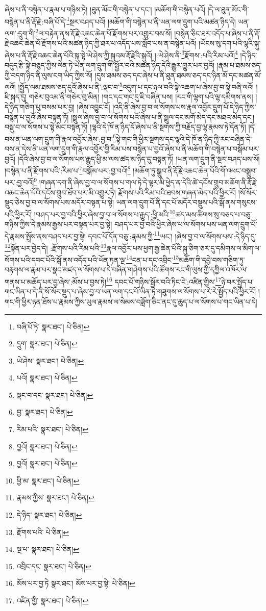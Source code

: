 ཞེས་པ་ནི་བསྙེན་པ་རྣམ་པ་གཉིས་ཏེ། །ཐུན་མོང་གི་བསྙེན་པ་དང་། །མཆོག་གི་བསྙེན་པའོ། །དེ་ལ་ཐུན་མོང་གི་བསྙེན་པ་ནི་རྡོ་རྗེ་:བཞི་པོ་དེ་\footnote{བཞི་པོ་ཏེ་  སྣར་ཐང་།  པེ་ཅིན། }སྔར་བཤད་པའོ། །མཆོག་གི་བསྙེན་པ་ནི་ཡན་ལག་དྲུག་པའི་མཚན་ཉིད་དེ། ཡན་ལག་:དྲུག་གི་\footnote{དྲུག་  སྣར་ཐང་།  པེ་ཅིན། }ལ་བརྟེན་ནས་རྡོ་རྗེ་འཆང་ཆེན་པོ་རྫོགས་པར་འགྱུར་བས་སོ། །བསྙེན་ཅིང་ཐར་འདོད་པ་ཞེས་པ་ནི་རྡོ་རྗེ་འཆང་ཆེན་པོ་རྫོགས་པའི་མཚན་ཉིད་ཀྱི་ཐར་པ་འདོད་པས་སློབ་པས་ན་བསྙེན་པའོ། །ཡོངས་སུ་དག་པའི་ལྷའི་སྐུ་ཞེས་པ་ནི་རྡོ་རྗེ་འཆང་ཆེན་པོའི་སྐུ་སྟེ་ཡེ་ཤེས་ཀྱི་སྐུའམ་རྡོ་རྗེའི་སྐུའོ། །:ཡེ་ཤེས་ནི་\footnote{ཡེ་ཤེས་  སྣར་ཐང་།  པེ་ཅིན། }རྫོགས་:པའི་རིམ་པའོ།\footnote{པའོ།  སྣར་ཐང་།  པེ་ཅིན། } །དེ་ཉིད་བདུད་རྩི་སྟེ་བཅུད་ཀྱིས་ལེན་ཏེ་ཡན་ལག་དྲུག་གི་སྦྱོར་བའི་མཚན་ཉིད་དེའི་རྒྱུར་གྱུར་པར་བྱའོ། །རྣམ་པ་ཐམས་ཅད་ཀྱི་བདག་ཉིད་ནི་ལུས་ངག་ཡིད་ཀྱིས་སོ། །དུས་ཐམས་ཅད་དང་ཞེས་པ་ནི་ཐུན་ཐམས་ཅད་དང་ཉིན་མོ་དང་མཚན་མོ་ལའོ། །སྤྱོད་ལམ་ཐམས་ཅད་དུའོ་ཞེས་པ་ནི་:ལྡང་བ་\footnote{ལྡང་བ་དང་  སྣར་ཐང་།  པེ་ཅིན། }འདུག་པ་དང་ཉལ་བའི་སྟེ་འཆག་པ་ཞེས་བྱ་བ་སྟེ་བཞི་ལའོ། །ཇི་སྐད་དུ། གཅེར་བུའམ་ནི་གཅེར་བུ་མིན། །གང་དང་གང་དུ་ཇི་བཞིན་པས། །རང་གི་ལྷག་པའི་ལྷ་དམིགས་ནས། །དེ་ཉིད་གཅིག་པུ་བསམ་པར་བྱ། །ཞེས་འབྱུང་ངོ། །འདི་ནི་ཞེས་བྱ་བ་ལ་སོགས་པས་རྣལ་འབྱོར་དྲུག་པོ་དེ་ཉིད་ཀྱིས་བསྙེན་པ་བྱའོ་ཞེས་བསྟན་ཏོ། །སྦྲུལ་ཞེས་བྱ་བ་ལ་སོགས་པའོ་ཞེས་པ་ནི་སྦྲུལ་དང་མགོ་མེད་དང་མཐའ་མེད་དང་། བསྡུ་བ་ལ་སོགས་པ་སྟེ་མིང་བསྟན་ཏོ། །ལྷའི་དེ་ཁོ་ན་ཉིད་དོ་ཞེས་པ་ནི་སྔགས་ཀྱི་བརྗོད་བྱ་ལྷ་རྣམས་ཏེ་དོན་ཏོ། །དེ་བས་ན་ཡན་ལག་དྲུག་གི་རྣལ་འབྱོར་ཞེས་:བྱ་བ་\footnote{བྱ་  སྣར་ཐང་།  པེ་ཅིན། }སྟེ་གང་གི་ཕྱིར་སྔགས་དང་ལྷའི་དེ་ཁོ་ན་ཉིད་ཀྱི་རང་བཞིན་དེ་བས་ན་དེས་ནི་ཡན་ལག་དྲུག་གི་རྣལ་འབྱོར་གྱི་རིམ་པས་བསྙེན་པ་བྱའོ་ཞེས་པ་ནི་མཆོག་གི་བསྙེན་པ་བསྒོམ་པར་བྱའོ། །དེའི་ཞེས་བྱ་བ་ལ་སོགས་པས་རྒྱུད་ཕྱི་མ་ལས་ཚད་མ་ཉིད་དུ་བསྟན་ཏོ། །ཡན་ལག་དྲུག་ནི་སྔར་བཤད་པས་སོ། །བསྙེན་པ་ནི་རྫོགས་པའི་:རིམ་པ་\footnote{རིམ་པའི་  སྣར་ཐང་།  པེ་ཅིན། }བསྒོམ་པར་:བྱ་བའོ།\footnote{བྱའོ།  སྣར་ཐང་།  པེ་ཅིན། } །མཆོག་ཏུ་སྒྲུབ་ནི་རྡོ་རྗེ་འཆང་ཆེན་པོའི་གོ་འཕང་བསྒྲུབ་པར་:བྱ་བའོ།\footnote{བྱའོ།  སྣར་ཐང་།  པེ་ཅིན། } །གཞན་དག་ནི་ཞེས་བྱ་བ་ལ་སོགས་པ་གལ་ཏེ་དེ་ལྟར་མི་ཕྱེད་ན་དེའི་ཚེ་དངོས་གྲུབ་མཆོག་ནི་རྡོ་རྗེ་འཆང་ཆེན་པོའི་དངོས་གྲུབ་ཐོབ་པར་མི་འགྱུར་ཏེ། རྫོགས་པའི་རིམ་པའི་ཐབས་གཞན་མེད་པའི་ཕྱིར་རོ། །སོ་སོར་སྡུད་ཅེས་བྱ་བ་ལ་སོགས་པས་མདོར་བསྟན་པ་སྟེ། ཡན་ལག་དྲུག་པོ་ནི་དང་པོ་མདོར་བསྡུས་པའི་སྒོ་ནས་གསུངས་པའི་ཕྱིར་རོ། །བཤད་པར་བྱ་བའི་ཕྱིར་ཞེས་བྱ་བ་ལ་སོགས་པ་རྒྱུད་:ཕྱི་མའི་\footnote{ཕྱི་མ་  སྣར་ཐང་།  པེ་ཅིན། }ཚད་མས་ཚིགས་སུ་བཅད་པ་བཅུ་གཉིས་ཀྱིས་དེ་རྣམས་རྒྱས་པར་བསྟན་པར་བྱ་སྟེ། བཤད་པར་བྱ་བའི་ཕྱིར་ཞེས་པ་ལ་སོགས་པས་ཡན་ལག་དྲུག་པོ་དེ་རྣམས་སྤྲོས་ནས་བཤད་པར་བྱ་སྟེ། དབང་པོ་དོན་བཅུ་:རྣམས་ཀྱི་\footnote{རྣམས་ཀྱིས་  སྣར་ཐང་།  པེ་ཅིན། }ཡང་། །ཞེས་བྱ་བ་ལ་སོགས་པས་:དེ་ཉིད་དུ་\footnote{དེ་ཉིད་  སྣར་ཐང་།  པེ་ཅིན། }སྟོན་པར་བྱེད་དེ། :རྫོགས་པའི་རིམ་པའི་\footnote{རྫོགས་པའི་  པེ་ཅིན། }རྣལ་འབྱོར་པས་ཕྱག་རྒྱ་ཆེན་པོའི་སྐུ་ཅིག་ཅར་དུ་དམིགས་ལ་མིག་ལ་སོགས་པའི་དབང་པོའི་སྒོ་ནས་འདོད་པའི་ཡོན་ཏན་ལྔ་\footnote{ལྔ་པ་  སྣར་ཐང་།  པེ་ཅིན། }ངན་པ་དང་འབྲིང་\footnote{འབྲིང་དང་  སྣར་ཐང་།  པེ་ཅིན། }མཆོག་གི་དབྱེ་བས་གཅིག་ཏུ་བརྟགས་ལ་རྣམ་པར་སྣང་མཛད་ལ་སོགས་པ་དེ་བཞིན་གཤེགས་པའི་ཚོགས་རང་གི་ལུས་ཀྱི་དཀྱིལ་འཁོར་ལ་གནས་པ་མཆོད་པར་བྱ་ཞེས་:མོས་པ་བྱས་ཏེ།\footnote{མོས་པར་བྱ་ཏེ  སྣར་ཐང་། མོས་པར་བྱ་སྟེ།  པེ་ཅིན། } དབང་པོ་གཉིས་སྦྱོར་བའི་ཏིང་ངེ་:འཛིན་གྱིས་\footnote{འཛིན་གྱི་  སྣར་ཐང་།  པེ་ཅིན། }ཉེ་བར་སྤྱོད་པ་གང་ཡིན་པ་དེ་ནི་སོ་སོར་སྡུད་པ་ཞེས་བྱ་བ་ཡན་ལག་དང་པོ་ཡིན་ཏེ་གཟུགས་ལ་སོགས་པ་རེ་རེ་སྤྱོད་པའི་ཕྱིར་རོ། །གང་གི་ཕྱིར་ཉན་ཐོས་པ་རྣམས་ཀྱིས་ཡུལ་རྣམས་ལ་སེམས་བཟློག་ཅིང་ནང་དུ་ཆུད་པ་ལ་སོགས་པ་གང་ཡིན་པ་དེ། 
